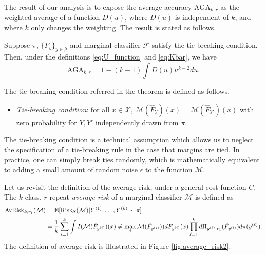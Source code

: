 The result of our analysis is to expose the average accuracy
$\text{AGA}_{k, r}$ as the weighted average of a function
$\bar{D}(u)$, where $\bar{D}(u)$ is independent of $k$, and where $k$
only changes the weighting.  The result is stated as follows.

\begin{theorem}\label{theorem:avrisk_identity}
Suppose $\pi$, $\{F_y\}_{y \in \mathcal{Y}}$ and marginal classifier
$\mathcal{F}$ satisfy the tie-breaking condition.  Then, under the
definitions \eqref{eq:U_function} and \eqref{eq:Kbar}, we have
\begin{equation}\label{eq:avrisk_identity}
\text{AGA}_{k, r} = 1 - (k-1) \int \bar{D}(u) u^{k-2} du.
\end{equation}
\end{theorem}

The tie-breaking condition referred in the theorem is defined as follows.
\begin{itemize}
\item 
\emph{Tie-breaking condition}: for all $x \in \mathcal{X}$,
$\mathcal{M}(\hat{F}_Y)(x) = \mathcal{M}(\hat{F}_{Y'})(x)$
with zero probability for $Y, Y'$ independently drawn from $\pi$.
\end{itemize}
The tie-breaking condition is a technical assumption which allows us
to neglect the specification of a tie-breaking rule in the case that
margins are tied.  In practice, one can simply break ties randomly,
which is mathematically equivalent to adding a small amount of random
noise $\epsilon$ to the function $\mathcal{M}$.

\iffalse

Let us revisit the definition of the average risk, under a general
cost function $C$.  The $k$-class, $r$-repeat \emph{average risk} of a
marginal classifier $\mathcal{M}$ is defined as
\begin{align*}
\text{AvRisk}_{k,r_1}(\mathcal{M}) &= \textbf{E}[\text{Risk}_{\mathcal{S}}(\mathcal{M})|Y^{(1)}, \hdots, Y^{(k)} \sim \pi]
\\&= \frac{1}{k} \sum_{i=1}^k \int
I(\mathcal{M}(\hat{F}_{y^{(i)}})(x) \neq \max_j
\mathcal{M}(\hat{F}_{y^{(j)}})) dF_{y^{(i)}}(x) \prod_{\ell=1}^k
d\Pi_{y^{(\ell)}, r_1}(\hat{F}_{y^{(\ell)}}) d\pi(y^{(\ell)}).
\end{align*}
The definition of average risk is illustrated in Figure \ref{fig:average_risk2}.

